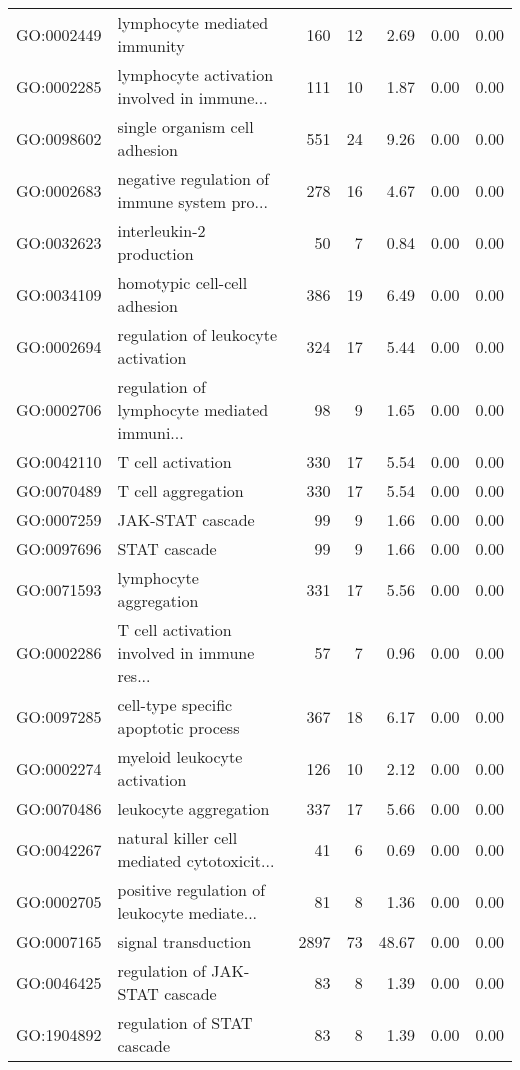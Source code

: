 \begin{table}[ht]
\begin{tabular}{llrrrrr}
  GO:0002449 & lymphocyte mediated immunity & 160 &  12 & 2.69 & 0.00 & 0.00 \\ 
  GO:0002285 & lymphocyte activation involved in immune... & 111 &  10 & 1.87 & 0.00 & 0.00 \\ 
  GO:0098602 & single organism cell adhesion & 551 &  24 & 9.26 & 0.00 & 0.00 \\ 
  GO:0002683 & negative regulation of immune system pro... & 278 &  16 & 4.67 & 0.00 & 0.00 \\ 
  GO:0032623 & interleukin-2 production &  50 &   7 & 0.84 & 0.00 & 0.00 \\ 
  GO:0034109 & homotypic cell-cell adhesion & 386 &  19 & 6.49 & 0.00 & 0.00 \\ 
  GO:0002694 & regulation of leukocyte activation & 324 &  17 & 5.44 & 0.00 & 0.00 \\ 
  GO:0002706 & regulation of lymphocyte mediated immuni... &  98 &   9 & 1.65 & 0.00 & 0.00 \\ 
  GO:0042110 & T cell activation & 330 &  17 & 5.54 & 0.00 & 0.00 \\ 
  GO:0070489 & T cell aggregation & 330 &  17 & 5.54 & 0.00 & 0.00 \\ 
  GO:0007259 & JAK-STAT cascade &  99 &   9 & 1.66 & 0.00 & 0.00 \\ 
  GO:0097696 & STAT cascade &  99 &   9 & 1.66 & 0.00 & 0.00 \\ 
  GO:0071593 & lymphocyte aggregation & 331 &  17 & 5.56 & 0.00 & 0.00 \\ 
  GO:0002286 & T cell activation involved in immune res... &  57 &   7 & 0.96 & 0.00 & 0.00 \\ 
  GO:0097285 & cell-type specific apoptotic process & 367 &  18 & 6.17 & 0.00 & 0.00 \\ 
  GO:0002274 & myeloid leukocyte activation & 126 &  10 & 2.12 & 0.00 & 0.00 \\ 
  GO:0070486 & leukocyte aggregation & 337 &  17 & 5.66 & 0.00 & 0.00 \\ 
  GO:0042267 & natural killer cell mediated cytotoxicit... &  41 &   6 & 0.69 & 0.00 & 0.00 \\ 
  GO:0002705 & positive regulation of leukocyte mediate... &  81 &   8 & 1.36 & 0.00 & 0.00 \\ 
  GO:0007165 & signal transduction & 2897 &  73 & 48.67 & 0.00 & 0.00 \\ 
  GO:0046425 & regulation of JAK-STAT cascade &  83 &   8 & 1.39 & 0.00 & 0.00 \\ 
  GO:1904892 & regulation of STAT cascade &  83 &   8 & 1.39 & 0.00 & 0.00 \\ 

\end{tabular}
\end{table}
